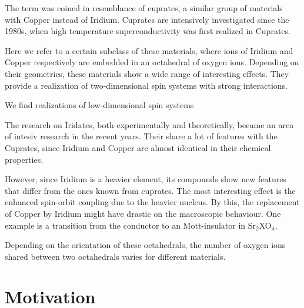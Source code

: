 \documentclass[a4paper,10pt]{report}
\begin{document}

The term was coined in resemblance of cuprates, a similar group of materials with Copper instead of Iridium.
Cuprates are intensively investigated since the 1980s, when high temperature superconductivity was first realized in Cuprates.


Here we refer to a certain subclass of these materials, where ions of Iridium and Copper respectively are embedded in an octahedral of oxygen ions.
Depending on their geometries, these materials show a wide range of interesting effects.
They provide a realization of two-dimensional spin systems with strong interactions. 

We find realizations of low-dimensional spin systems

The research on Iridates, both experimentally and theoretically, became an area of intesiv research in the recent years. 
Their share a lot of features with the Cuprates, since Iridium and Copper are almost identical in their chemical properties. 

However, since Iridium is a heavier element, its compounds show new features that differ from the ones known from cuprates.
The most interesting effect is the enhanced spin-orbit coupling due to the heavier nucleus.
By this, the replacement of Copper by Iridium might have drastic on the macroscopic behaviour. 
One example is a transition from the conductor to an Mott-insulator in Sr$_2$XO$_4$, 

Depending on the orientation of these octahedrals, the number of oxygen ions shared between two octahedrals varies for different materials. 





\section{Motivation}

\end{document}
